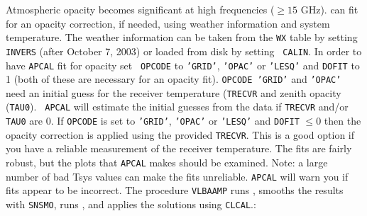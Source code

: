 Atmospheric opacity becomes significant at high frequencies ($\ge15$
GHz).   {\tt {}} can fit for an opacity correction, if
needed, using weather information and system temperature.  The weather
information can be taken from the {\tt WX} table by setting {\tt
INVERS} (after October 7, 2003) or loaded from disk by setting {\tt
CALIN}\@.  In order to have {\tt APCAL} fit for opacity set {\tt
OPCODE} to {\tt 'GRID'}, {\tt 'OPAC'} or {\tt 'LESQ'} and {\tt DOFIT}
to 1 (both of these are necessary for an opacity fit).  {\tt OPCODE
'GRID'} and {\tt 'OPAC'} need an initial guess for the receiver
temperature ({\tt TRECVR} and zenith opacity ({\tt TAU0})\@.  {\tt
APCAL} will estimate the initial guesses from the data if {\tt TRECVR}
and/or {\tt TAU0} are 0.  If
{\tt OPCODE} is set to {\tt 'GRID'}, {\tt 'OPAC'} or {\tt 'LESQ'} and
{\tt DOFIT} $\leq 0$ then the opacity correction is applied using the
provided {\tt TRECVR}\@.  This is a good option if you have a reliable
measurement of the receiver temperature.  The fits are fairly robust,
but the plots that {\tt APCAL} makes should be examined.  Note: a large
number of bad Tsys values can make the fits unreliable.  {\tt APCAL}
will warn you if fits appear to be incorrect.
The procedure {\tt VLBAAMP} runs {\tt {}}, smooths the
results with {\tt SNSMO}, runs {\tt {}}, and applies the
solutions using {\tt CLCAL}\@.:


